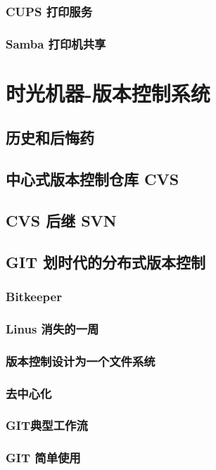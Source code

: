 \documentclass[amstex,twoside]{ctexbook}
\begin{document}
\subsection{ CUPS 打印服务	}
\subsection{ Samba 打印机共享	}

\ifdefined\compileall

\else
\addtocounter{chapter}{1}
\fi


\chapter{时光机器-版本控制系统}\label{chap:VCS}
\section{   历史和后悔药	}
\section{   中心式版本控制仓库 CVS	}
\section{   CVS 后继 SVN	}
\section{GIT 划时代的分布式版本控制\label{sec:git}}
\subsection{  Bitkeeper	}
\subsection{  Linus 消失的一周	}
\subsection{  版本控制设计为一个文件系统	}
\subsection{ 去中心化	}
\subsection{  GIT典型工作流	}
\subsection{  GIT 简单使用	}
\end{document}
